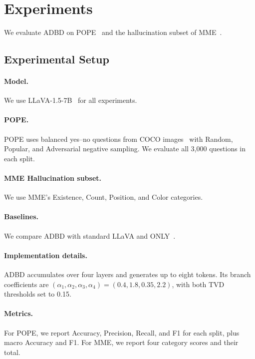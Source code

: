 \section{Experiments}
\label{sec:experiments}

We evaluate ADBD on POPE~\cite{li2023pope} and the hallucination subset of MME~\cite{fu2023mme}.

\subsection{Experimental Setup}

\paragraph{Model.}
We use LLaVA-1.5-7B~\cite{liu2024visual} for all experiments.

\paragraph{POPE.}
POPE uses balanced yes--no questions from COCO images~\cite{lin2014microsoft} with Random, Popular, and Adversarial negative sampling. We evaluate all 3,000 questions in each split.

\paragraph{MME Hallucination subset.}
We use MME's Existence, Count, Position, and Color categories. 

\paragraph{Baselines.}
We compare ADBD with standard LLaVA and ONLY~\cite{wan2025only}.

\paragraph{Implementation details.}
ADBD accumulates over four layers and generates up to eight tokens. Its branch coefficients are $(\alpha_1,\alpha_2,\alpha_3,\alpha_4)=(0.4,1.8,0.35,2.2)$, with both TVD thresholds set to 0.15. 

\paragraph{Metrics.}
For POPE, we report Accuracy, Precision, Recall, and F1 for each split, plus macro Accuracy and F1. For MME, we report four category scores and their total.

